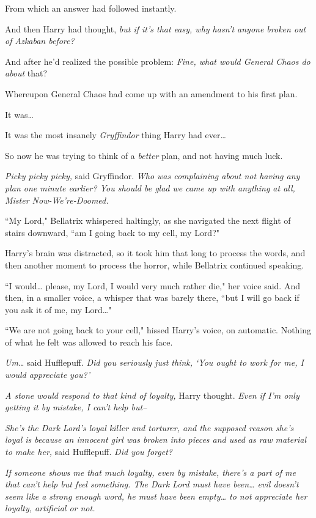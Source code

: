 From which an answer had followed instantly.

And then Harry had thought, \emph{but if it's \emph{that} easy, why hasn't anyone broken out of Azkaban before?}

And after he'd realized the possible problem: \emph{Fine, what would General Chaos do about} that?

Whereupon General Chaos had come up with an amendment to his first plan.

It was{\ldots}

It was the most insanely \emph{Gryffindor} thing Harry had ever{\ldots}

So now he was trying to think of a \emph{better} plan, and not having much luck.

\emph{Picky picky picky,} said Gryffindor. \emph{Who was complaining about not having \emph{any} plan one minute earlier? You should be glad we came up with anything at all, Mister Now-We're-Doomed.}

``My Lord," Bellatrix whispered haltingly, as she navigated the next flight of stairs downward, ``am I going back to my cell, my Lord?"

Harry's brain was distracted, so it took him that long to process the words, and then another moment to process the horror, while Bellatrix continued speaking.

``I would{\ldots} please, my Lord, I would very much rather die," her voice said. And then, in a smaller voice, a whisper that was barely there, ``but I will go back if you ask it of me, my Lord{\ldots}"

``We are not going back to your cell," hissed Harry's voice, on automatic. Nothing of what he felt was allowed to reach his face.

\emph{Um{\ldots}} said Hufflepuff. \emph{Did you seriously just think, `You ought to work for me, \emph{I} would appreciate you?'}

\emph{A stone would respond to that kind of loyalty,} Harry thought. \emph{Even if I'm only getting it by mistake, I can't help but\---}

\emph{She's the Dark Lord's loyal killer and torturer, and the supposed reason she's loyal is because an innocent girl was broken into pieces and used as raw material to make her,} said Hufflepuff. \emph{Did you forget?}

\emph{If someone shows me that much loyalty, even by mistake, there's a part of me that can't help but feel something. The Dark Lord must have been{\ldots} \emph{evil} doesn't seem like a strong enough word, he must have been \emph{empty{\ldots}} to not appreciate her loyalty, artificial or not.}


